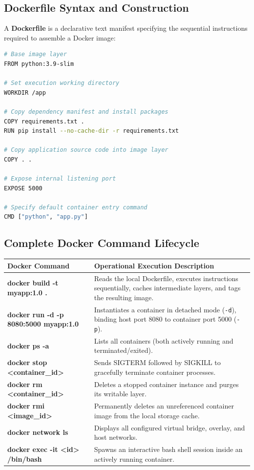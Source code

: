 \subsection{Dockerfile Syntax and Construction}
A \textbf{Dockerfile} is a declarative text manifest specifying the sequential instructions required to assemble a Docker image:
\begin{lstlisting}[language=bash]
# Base image layer
FROM python:3.9-slim

# Set execution working directory
WORKDIR /app

# Copy dependency manifest and install packages
COPY requirements.txt .
RUN pip install --no-cache-dir -r requirements.txt

# Copy application source code into image layer
COPY . .

# Expose internal listening port
EXPOSE 5000

# Specify default container entry command
CMD ["python", "app.py"]
\end{lstlisting}

\subsection{Complete Docker Command Lifecycle}
\begin{center}
\begin{tabularx}{\textwidth}{>{\bfseries\ttfamily}l X}
\toprule
Docker Command & Operational Execution Description\\
\midrule
docker build -t myapp:1.0 . & Reads the local Dockerfile, executes instructions sequentially, caches intermediate layers, and tags the resulting image.\\
docker run -d -p 8080:5000 myapp:1.0 & Instantiates a container in detached mode (\texttt{-d}), binding host port 8080 to container port 5000 (\texttt{-p}).\\
docker ps -a & Lists all containers (both actively running and terminated/exited).\\
docker stop <container\_id> & Sends SIGTERM followed by SIGKILL to gracefully terminate container processes.\\
docker rm <container\_id> & Deletes a stopped container instance and purges its writable layer.\\
docker rmi <image\_id> & Permanently deletes an unreferenced container image from the local storage cache.\\
docker network ls & Displays all configured virtual bridge, overlay, and host networks.\\
docker exec -it <id> /bin/bash & Spawns an interactive bash shell session inside an actively running container.\\
\bottomrule
\end{tabularx}
\end{center}

